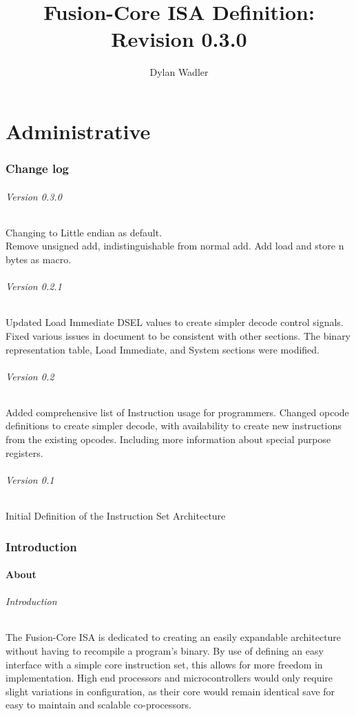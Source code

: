 \documentclass[letterpaper, 11pt]{article}
\title{Fusion-Core ISA Definition: Revision 0.3.0}
\author{Dylan Wadler}
\begin{document}
\maketitle
\newpage
\tableofcontents


\newpage
\part{Administrative}
\section{Change log}
\paragraph{Version 0.3.0} Changing to Little endian as default. \\Remove unsigned add, indistinguishable from normal add. Add load and store n bytes as macro.\\
\paragraph{Version 0.2.1} Updated Load Immediate DSEL values to create simpler decode control signals. Fixed various issues in document to be consistent with other sections. The binary representation table, Load Immediate, and System sections were modified.
\paragraph{Version 0.2} Added comprehensive list of Instruction usage for programmers. Changed opcode definitions to create simpler
decode, with availability to create new instructions from the existing opcodes. Including more information about special purpose registers.
\paragraph{Version 0.1} Initial Definition of the Instruction Set Architecture

\section{Introduction}

\subsection{About}
\paragraph{Introduction}The Fusion-Core ISA is dedicated to creating an easily expandable architecture without having to 
recompile a program's binary. By use of defining an easy interface with a simple core instruction set, this allows for
more freedom in implementation. High end processors and microcontrollers would only require slight variations in
configuration, as their core would remain identical save for easy to maintain and scalable co-processors.
\end{document}
